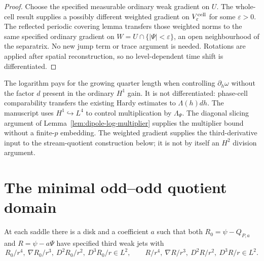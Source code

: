 \begin{proof}
\leanok
Choose the specified measurable ordinary weak gradient on $U$.
The whole-cell result supplies a possibly different weighted gradient on
$V_\varepsilon^{\rm cell}$ for some $\varepsilon>0$.
The reflected periodic covering lemma transfers those weighted norms
to the same specified ordinary gradient on
$W=U\cap\{|\Psi|<\varepsilon\}$, an open neighbourhood of the separatrix.
No new jump term or trace argument is needed.
Rotations are applied after spatial reconstruction, so no level-dependent
time shift is differentiated.
\end{proof}

\begin{remark}
The logarithm pays for the growing quarter length when controlling
$\partial_h\omega$ without the factor $d$ present in the ordinary $H^1$
gain. It is not differentiated: phase-cell comparability transfers the
existing Hardy estimates to $\Lambda(h)dh$.
The manuscript uses $H^1\hookrightarrow L^4$ to control multiplication by
$\Lambda_\Psi$. The diagonal slicing argument of
Lemma~\ref{lem:dipole-log-multiplier} supplies the multiplier bound
without a finite-$p$ embedding. The weighted gradient supplies the
third-derivative input to the stream-quotient construction below; it is not
by itself an $H^2$ division argument.
\end{remark}

\section{The minimal odd--odd quotient domain}

\begin{lemma}
\label{lem:dd-weighted-third-stream}
\leanok
At each saddle there is a disk and a coefficient $a$ such that both
$R_0=\psi-Q_{P,a}$ and $R=\psi-a\Psi$ have specified third weak jets with
\[
 R_0/r^4,\ \nabla R_0/r^3,\ D^2R_0/r^2,\ D^3R_0/r\in L^2,
 \qquad
 R/r^4,\ \nabla R/r^3,\ D^2R/r^2,\ D^3R/r\in L^2.
\]
\end{lemma}

